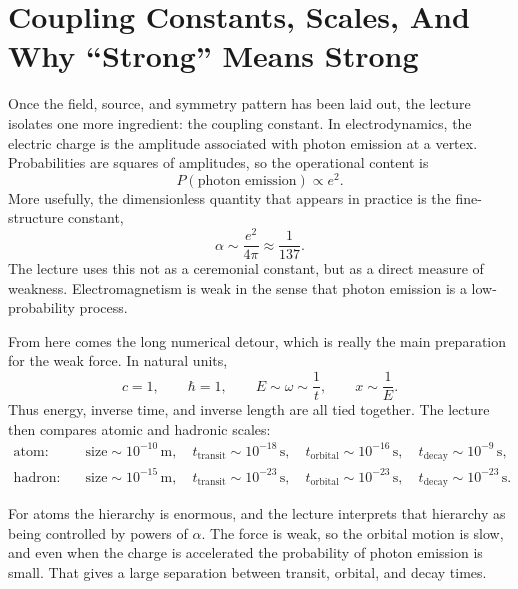 \section{Coupling Constants, Scales, And Why ``Strong'' Means Strong}

Once the field, source, and symmetry pattern has been laid out, the lecture isolates one more ingredient: the coupling constant. In electrodynamics, the electric charge is the amplitude associated with photon emission at a vertex. Probabilities are squares of amplitudes, so the operational content is
\begin{equation}
P(\text{photon emission}) \propto e^2.
\end{equation}
More usefully, the dimensionless quantity that appears in practice is the fine-structure constant,
\begin{equation}
\alpha \sim \frac{e^2}{4\pi} \approx \frac{1}{137}.
\end{equation}
The lecture uses this not as a ceremonial constant, but as a direct measure of weakness. Electromagnetism is weak in the sense that photon emission is a low-probability process.

From here comes the long numerical detour, which is really the main preparation for the weak force. In natural units,
\begin{equation}
c=1,
\qquad
\hbar=1,
\qquad
E \sim \omega \sim \frac{1}{t},
\qquad
x \sim \frac{1}{E}.
\end{equation}
Thus energy, inverse time, and inverse length are all tied together. The lecture then compares atomic and hadronic scales:
\begin{align}
\text{atom:}\quad
&\text{size}\sim 10^{-10}\,\mathrm m,\quad
t_{\text{transit}}\sim 10^{-18}\,\mathrm s,\quad
t_{\text{orbital}}\sim 10^{-16}\,\mathrm s,\quad
t_{\text{decay}}\sim 10^{-9}\,\mathrm s,\\
\text{hadron:}\quad
&\text{size}\sim 10^{-15}\,\mathrm m,\quad
t_{\text{transit}}\sim 10^{-23}\,\mathrm s,\quad
t_{\text{orbital}}\sim 10^{-23}\,\mathrm s,\quad
t_{\text{decay}}\sim 10^{-23}\,\mathrm s.
\end{align}

For atoms the hierarchy is enormous, and the lecture interprets that hierarchy as being controlled by powers of \(\alpha\). The force is weak, so the orbital motion is slow, and even when the charge is accelerated the probability of photon emission is small. That gives a large separation between transit, orbital, and decay times.

